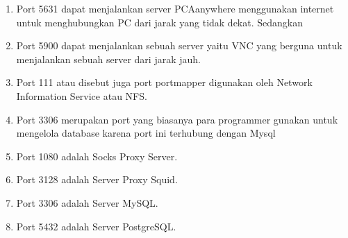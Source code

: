 \documentclass[12pt,a4paper]{article}
\begin{document}
\begin{enumerate}
\item Port 5631 dapat menjalankan server PCAanywhere menggunakan internet untuk menghubungkan PC dari jarak yang tidak dekat.
Sedangkan 
\item Port 5900 dapat menjalankan sebuah server yaitu VNC yang berguna untuk menjalankan sebuah server dari jarak jauh.
\item Port 111 atau disebut juga port portmapper digunakan oleh Network Information Service atau NFS.
\item Port 3306 merupakan port yang biasanya para programmer gunakan untuk mengelola database karena port ini terhubung dengan Mysql
\item Port 1080 adalah Socks Proxy Server.
\item Port 3128 adalah Server Proxy Squid.
\item Port 3306 adalah Server MySQL.
\item Port 5432 adalah Server PostgreSQL.

\end{enumerate}
\end{document}
